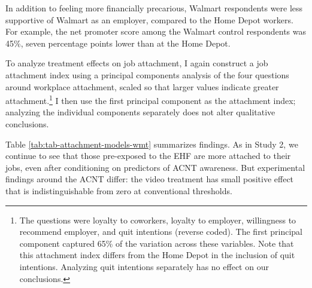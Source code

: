 \documentclass[
  11pt,
  oneside]{article}
\begin{document}
In addition to feeling more financially precarious, Walmart respondents were less supportive of Walmart as an employer, compared to the Home Depot workers. For example, the net promoter score among the Walmart control respondents was 45\%, seven percentage points lower than at the Home Depot.

To analyze treatment effects on job attachment, I again construct a job attachment index using a principal components analysis of the four questions around workplace attachment, scaled so that larger values indicate greater attachment.\footnote{The questions were loyalty to coworkers, loyalty to employer, willingness to recommend employer, and quit intentions (reverse coded). The first principal component captured 65\% of the variation across these variables. Note that this attachment index differs from the Home Depot in the inclusion of quit intentions. Analyzing quit intentions separately has no effect on our conclusions.} I then use the first principal component as the attachment index; analyzing the individual components separately does not alter qualitative conclusions.

Table \ref{tab:tab-attachment-models-wmt} summarizes findings. As in Study 2, we continue to see that those pre-exposed to the EHF are more attached to their jobs, even after conditioning on predictors of ACNT awareness. But experimental findings around the ACNT differ: the video treatment has small positive effect that is indistinguishable from zero at conventional thresholds.
\end{document}
